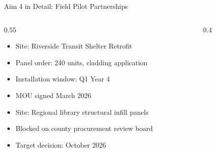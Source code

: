 \begin{frame}{Aim 4 in Detail: Field Pilot Partnerships}
\begin{columns}[T,onlytextwidth]
\begin{column}{0.55\textwidth}
\begin{tcolorbox}[infobox, title=Apex Municipal Works --- Confirmed]
\footnotesize
\begin{itemize}[leftmargin=*, itemsep=0pt, topsep=1pt, parsep=0pt]
  \item Site: Riverside Transit Shelter Retrofit
  \item Panel order: 240 units, cladding application
  \item Installation window: Q1 Year 4
  \item MOU signed March 2026
\end{itemize}
\end{tcolorbox}
\par\vspace{4pt}
\begin{tcolorbox}[riskbox, title=Nimbus County Public Works --- In Negotiation]
\footnotesize
\begin{itemize}[leftmargin=*, itemsep=0pt, topsep=1pt, parsep=0pt]
  \item Site: Regional library structural infill panels
  \item Blocked on county procurement review board
  \item Target decision: October 2026
\end{itemize}
\end{tcolorbox}
\end{column}
\begin{column}{0.4\textwidth}
\centering
{}
\end{column}
\end{columns}
\end{frame}
